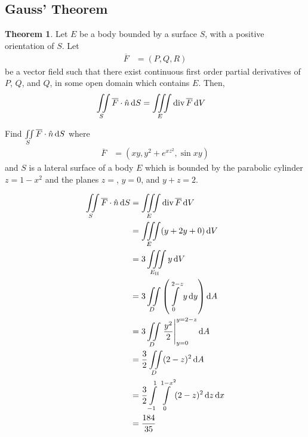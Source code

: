 \documentclass[fleqn, a4paper, 8pt, twoside]{amsart}
\theoremstyle{definition}
\theoremstyle{bluedefinition}
\theoremstyle{redtheorem}
\newtheorem{theorem}{Theorem}
\newcommand{\divergence}{\mathrm{div\,}}
\begin{document}
\begin{multicols}{2}
\begin{spacing}{0.7}
\section{Gauss' Theorem}

\begin{theorem}
	Let $E$ be a body bounded by a surface $S$, with a positive orientation of $S$.
	Let
	\begin{align*}
		\overline{F} & = (P,Q,R)
	\end{align*}
	be a vector field such that there exist continuous first order partial derivatives of $P$, $Q$, and $Q$, in some open domain which contains $E$.
	Then,
	\begin{align*}
		\iint\limits_{S} \overline{F} \cdot \hat{n} \dif S & = \iiint\limits_{E} \divergence \overline{F} \dif V
	\end{align*}
	\label{Gauss's_Theorem}
\end{theorem}

\begin{question}
	Find $\iint\limits_{S} \overline{F} \cdot \hat{n} \dif S$ where
	\begin{align*}
		\overline{F} & = \left( x y , y^2 + e^{x z^2} , \sin x y \right)
	\end{align*}
	and $S$ is a lateral surface of a body $E$ which is bounded by the parabolic cylinder $z = 1 - x^2$ and the planes $z = $, $y = 0$, and $y + z = 2$.
\end{question}

\begin{solution}
	\begin{align*}
		\iint\limits_{S} \overline{F} \cdot \hat{n} \dif S & = \iiint\limits_{E} \divergence \overline{F} \dif V                                          \\
                                                                   & = \iiint\limits_{E} (y + 2 y + 0) \dif V                                                     \\
                                                                   & = 3 \iiint\limits_{E_{\mathrm{II}}} y \dif V                                                 \\
                                                                   & = 3 \iint\limits_{D} \left( \int\limits_{0}^{2 - z} y \dif y \right) \dif A                  \\
                                                                   & = 3 \iint\limits_{D} \left. \frac{y^2}{2} \right|_{y = 0}^{y = 2 - z} \dif A                 \\
                                                                   & = \frac{3}{2} \iint\limits_{D} (2 - z)^2 \dif A                                              \\
                                                                   & = \frac{3}{2} \int\limits_{-1}^{1} \int\limits_{0}^{1 - x^2} (2 - z)^2 \dif z \dif x         \\
                                                                   & = \frac{184}{35}
	\end{align*}
\end{solution}


\end{spacing}
\end{multicols}
\end{document}
